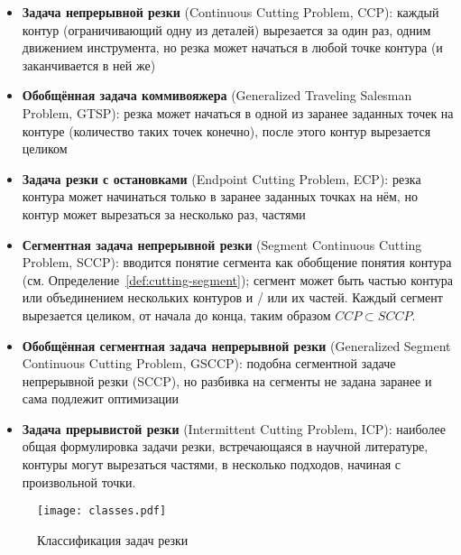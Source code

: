 \begin{itemize}
  \item
  \textbf{Задача непрерывной резки}
  (Continuous Cutting Problem, CCP):
  каждый контур
  (ограничивающий одну из деталей)
  вырезается за один раз,
  одним движением инструмента,
  но резка может начаться в любой точке контура
  (и заканчивается в ней же)

  \item
  \textbf{Обобщённая задача коммивояжера}
  (Generalized Traveling Salesman Problem, GTSP):
  резка может начаться в одной из заранее
  заданных точек на контуре
  (количество таких точек конечно),
  после этого контур вырезается целиком

  \item
  \textbf{Задача резки с остановками}
  (Endpoint Cutting Problem, ECP):
  резка контура может начинаться только в
  заранее заданных точках на нём,
  но контур может вырезаться за несколько раз,
  частями

  \item
  \textbf{Сегментная задача непрерывной резки}
  (Segment Continuous Cutting Problem, SCCP):
  вводится понятие сегмента
  как обобщение понятия контура
  (см. Определение~\ref{def:cutting-segment});
  сегмент может быть частью контура
  или объединением нескольких контуров
  и / или их частей.
  Каждый сегмент вырезается целиком,
  от начала до конца,
  таким образом
  $ CCP \subset SCCP$.

  \item
  \textbf{Обобщённая сегментная задача непрерывной резки}
  (Generalized Segment Continuous Cutting Problem, GSCCP):
  подобна сегментной задаче непрерывной резки
  (SCCP),
  но разбивка на сегменты не задана заранее
  и сама подлежит оптимизации

  \item
  \textbf{Задача прерывистой резки}
  (Intermittent Cutting Problem, ICP):
  наиболее общая формулировка задачи резки,
  встречающаяся в научной литературе,
  контуры могут вырезаться частями,
  в несколько подходов,
  начиная с произвольной точки.
\end{itemize}

\begin{figure}
  \centering
  \texttt{[image: classes.pdf]}
  \caption{Классификация задач резки}
  \label{fig:cut-classes}
\end{figure}

